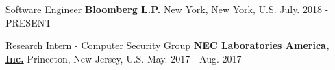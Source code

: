 

\begin{cventries}

\cventry
{Software Engineer} %
{\href{http://www.bloomberg.com/}{\bf Bloomberg L.P.}}  %
{New York, New York, U.S.} %
{July. 2018 - PRESENT} %
{
}
\vspace{-5mm}

\cventry
{Research Intern - Computer Security Group} %
{\href{http://www.nec-labs.com/}{\bf NEC Laboratories America, Inc.}}  %
{Princeton, New Jersey, U.S.} %
{May. 2017 - Aug. 2017} %
{
}
\vspace{-5mm}	
	

\end{cventries}

